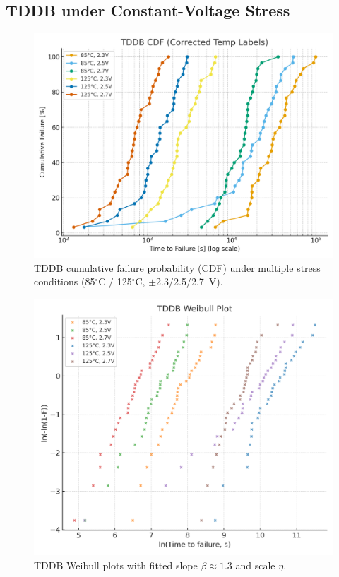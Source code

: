 \documentclass[conference]{IEEEtran}
\newcommand{\figw}{0.90\linewidth}
\begin{document}
\subsection{TDDB under Constant-Voltage Stress}
\begin{figure}[!t]
  \centering
  \includegraphics[width=\figw]{figures/fig4_tddb_cdf.png}
  \caption{TDDB cumulative failure probability (CDF) under multiple stress conditions (85$^\circ$C / 125$^\circ$C, $\pm$2.3/2.5/2.7~V).}
  \label{fig:tddb_cdf}
\end{figure}

\begin{figure}[!t]
  \centering
  \includegraphics[width=\figw]{figures/fig4_tddb_weibull.png}
  \caption{TDDB Weibull plots with fitted slope $\beta \approx 1.3$ and scale $\eta$.}
  \label{fig:tddb_weibull}
\end{figure}
\end{document}

